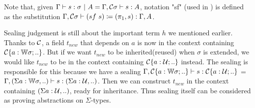 Note that, given ${ {\Gamma} \vdash {s} : {\sigma} \ |\ {A} } = { {\Gamma, {\mathcal{C}}\sigma} \vdash {s} : {A} }$, notation "sf"
(used in ) is defined as the substitution ${ {\Gamma,
{\mathcal{C}} \sigma} \vdash {(sf~s) \coloneqq (\pi_1, s)} : {\Gamma, A} }$.

Sealing judgement is still about the important term $h$ we mentioned
earlier. Thanks to ${\mathcal{C}}$, a field $t_{new}$ that depends on $a$ is now
in the context containing ${\mathcal{C}}\{a : {\mathbb{W}} \sigma; ..\}$.
But if we want $t_{new}$ to be inherited(reused) when $\sigma$ is
extended, we would like $t_{new}$ to be in the context containing
${\mathcal{C}}\{a : {\mathcal{U}}; ..\}$ instead. The sealing is responsible for this
because we have a sealing ${ {\Gamma, {\mathcal{C}}\{a : {\mathbb{W}} \sigma;
..\}} \vdash {s} : {{\mathcal{C}}\{a : {\mathcal{U}}; ..\}} }$ = ${ {\Gamma, (\Sigma a : {\mathbb{W}}
\sigma,..)} \vdash {s} : {(\Sigma a : {\mathcal{U}},..)} }$. Then we can construct
$t_{new}$ in the context containing $(\Sigma a : {\mathcal{U}},..)$, ready for
inheritance. Thus sealing itself can be considered as proving 
abstractions on $\Sigma$-types.



